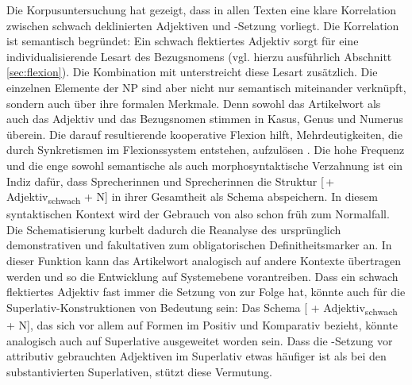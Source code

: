 Die Korpusuntersuchung hat gezeigt, dass in allen Texten eine klare Korrelation zwischen schwach deklinierten Adjektiven und -Setzung vorliegt. Die Korrelation ist semantisch begründet: Ein schwach flektiertes Adjektiv sorgt für eine individualisierende Lesart des Bezugsnomens (vgl. hierzu ausführlich Abschnitt \ref{sec:flexion}). Die Kombination mit  unterstreicht diese Lesart zusätzlich.  Die einzelnen Elemente der NP sind aber nicht nur semantisch miteinander verknüpft, sondern auch über ihre formalen Merkmale. Denn sowohl das Artikelwort als auch das Adjektiv und das Bezugsnomen stimmen in Kasus, Genus und Numerus überein. Die darauf resultierende kooperative Flexion hilft, Mehrdeutigkeiten, die durch Synkretismen im Flexionssystem entstehen, aufzulösen \parencite[127]{Szczepaniak2010}. Die hohe Frequenz und die enge sowohl semantische als auch morphosyntaktische Verzahnung ist ein Indiz dafür, dass Sprecherinnen und Sprecherinnen die Struktur [\,+\,Adjektiv\textsubscript{schwach} + N] in ihrer Gesamtheit als Schema abspeichern. In diesem syntaktischen Kontext wird der Gebrauch von  also schon früh zum Normalfall. Die Schematisierung kurbelt dadurch die Reanalyse des ursprünglich demonstrativen und fakultativen  zum obligatorischen Definitheitsmarker an. In dieser Funktion kann das Artikelwort analogisch auf andere Kontexte übertragen werden und so die Entwicklung auf Systemebene vorantreiben. Dass ein schwach flektiertes Adjektiv fast immer die Setzung von  zur Folge hat, könnte auch für die Superlativ-Konstruktionen von Bedeutung sein: Das Schema [ + Adjektiv\textsubscript{schwach} + N], das sich vor allem auf Formen im Positiv und Komparativ bezieht, könnte analogisch auch auf Superlative ausgeweitet worden sein. Dass die -Setzung vor attributiv gebrauchten Adjektiven im Superlativ etwas häufiger ist als bei den substantivierten Superlativen,  stützt diese Vermutung. 

